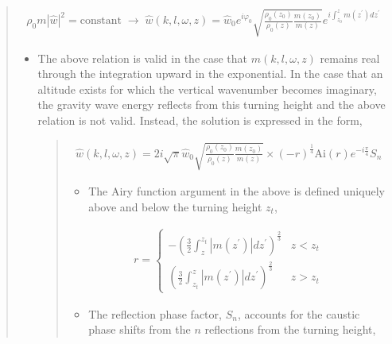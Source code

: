 \documentclass[letterpaper,10pt,english]{sphinxmanual}
\begin{document}
\begin{itemize}
\begin{quote}
\begin{itemize}
\end{itemize}
\begin{equation*}
\begin{split}\rho_0 m \left| \hat{w} \right|^2 = \text{constant} \; \rightarrow \;
\hat{w} \left( k, l, \omega, z \right) = \hat{w}_0 e^{i \varphi_0} \sqrt{ \frac{\rho_0 \left( z_0 \right)}{\rho_0 \left( z \right)} \frac{m \left( z_0 \right)}{m \left( z \right)}} e^{i \int_{z_0}^z{m \left( z^\prime \right) dz^\prime}}\end{split}
\end{equation*}\begin{itemize}
\item {} 
\sphinxAtStartPar
The above relation is valid in the case that \(m \left( k, l, \omega, z \right)\) remains real through the integration upward in the exponential.  In the case that an altitude exists for which the vertical wavenumber becomes imaginary, the gravity wave energy reflects from this turning height and the above relation is not valid.  Instead, the solution is expressed in the form,
\begin{quote}
\begin{equation*}
\begin{split}\hat{w} \left( k, l, \omega, z \right) = 2 i \sqrt{\pi} \hat{w}_0 \sqrt{ \frac{\rho_0 \left( z_0 \right)}{\rho_0 \left( z \right)} \frac{m \left( z_0 \right)}{m \left( z \right)}} \times \left( - r \right)^\frac{1}{4} \text{Ai} \left( r \right) e^{-i \frac{\pi}{4}} S_n\end{split}
\end{equation*}\begin{itemize}
\item {} 
\sphinxAtStartPar
The Airy function argument in the above is defined uniquely above and below the turning height \(z_t\),

\end{itemize}
\begin{equation*}
\begin{split}r = \left\{ \begin{matrix} - \left( \frac{3}{2} \int_z^{z_t} \left| m \left( z^\prime \right) \right| dz^\prime \right)^\frac{2}{3} & z < z_t \\ \left( \frac{3}{2} \int_{z_t}^z \left| m \left( z^\prime \right) \right| dz^\prime \right)^\frac{2}{3} & z > z_t \end{matrix} \right.\end{split}
\end{equation*}\begin{itemize}
\item {} 
\sphinxAtStartPar
The reflection phase factor, \(S_n\), accounts for the caustic phase shifts from the \(n\) reflections from the turning height,


\end{itemize}
\end{quote}
\end{itemize}
\end{quote}
\end{itemize}
\end{document}
